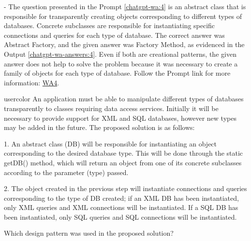  - The question presented in the Prompt \ref{chatgpt-wa:4} is an abstract class that is responsible for transparently creating objects corresponding to different types of databases. Concrete subclasses are responsible for instantiating specific connections and queries for each type of database. The correct answer was Abstract Factory, and the given answer was Factory Method, as evidenced in the Output \ref{chatgpt-wa-answers:4}. Even if both are creational patterns, the given answer does not help to solve the problem because it was necessary to create a family of objects for each type of database. Follow the Prompt link for more information: \href{https://chat.openai.com/share/1e475da1-7a8c-4a21-9361-f4549b329230}{WA4}.

\begin{chatquest}{usercolor}{\chatgptquest[chatgpt-wa:4]}
An application must be able to manipulate different types of databases transparently to classes requiring data access services. Initially it will be necessary to provide support for XML and SQL databases, however new types may be added in the future. The proposed solution is as follows:

1. An abstract class (DB) will be responsible for instantiating an object corresponding to the desired database type. This will be done through the static getDB() method, which will return an object from one of its concrete subclasses according to the parameter (type) passed.

2. The object created in the previous step will instantiate connections and queries corresponding to the type of DB created; if an XML DB has been instantiated, only XML queries and XML connections will be instantiated. If a SQL DB has been instantiated, only SQL queries and SQL connections will be instantiated.

Which design pattern was used in the proposed solution?
\end{chatquest}

